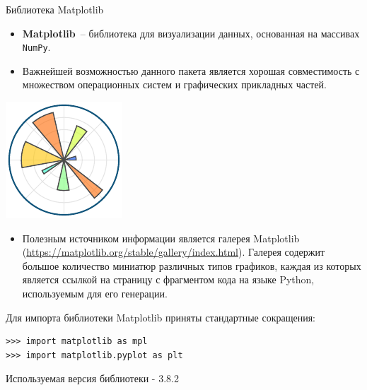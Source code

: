 \documentclass[aspectratio=169, mathserif]{beamer}	%
\begin{document}
\begin{frame}[fragile, label=m]{Библиотека Matplotlib}
\scriptsize
\begin{minipage}{.85\textwidth}
\begin{itemize}
\item \textbf{Matplotlib}~-- библиотека для визуализации данных, основанная на массивах  \texttt{NumPy}.
\item Важнейшей возможностью данного пакета является хорошая совместимость с множеством операционных систем и графических прикладных частей.
\end{itemize}
\end{minipage}
\begin{minipage}{.14\textwidth}
\includegraphics[width=\linewidth]{./pics/mpl_logo}
\end{minipage}
\begin{itemize}
\item Полезным источником информации является галерея Matplotlib (\url{https://matplotlib.org/stable/gallery/index.html}). Галерея содержит большое количество миниатюр различных типов графиков, каждая из которых является ссылкой на страницу с фрагментом кода на языке Python, используемым для его генерации.
\end{itemize}
\vfill
Для импорта библиотеки Matplotlib приняты стандартные сокращения:
\vfill
\begin{verbatim}
>>> import matplotlib as mpl
>>> import matplotlib.pyplot as plt
\end{verbatim}
\vfill
Используемая версия библиотеки - 3.8.2
\vfill
\end{frame}
\end{document}
